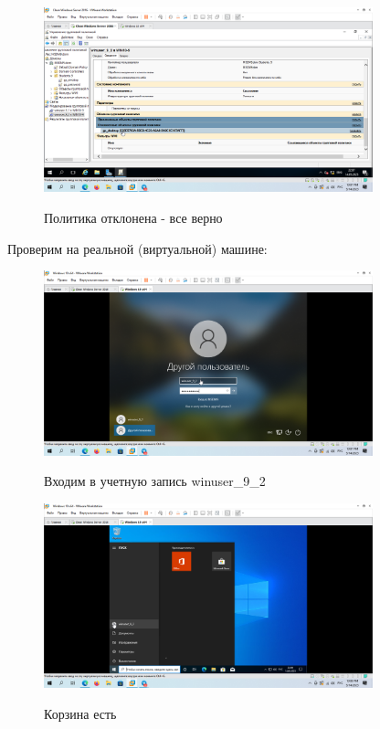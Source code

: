 \documentclass[a4paper]{article}
\begin{document}
  \begin{figure}[H]
    \centering
    \includegraphics[width=0.85\textwidth]{5_0174}
    \label{img:174}
    \caption{Политика отклонена - все верно}
  \end{figure}

  Проверим на реальной (виртуальной) машине:

  \begin{figure}[H]
    \centering
    \includegraphics[width=0.85\textwidth]{5_0176}
    \label{img:176}
    \caption{Входим в учетную запись winuser\_9\_2}
  \end{figure}

  \begin{figure}[H]
    \centering
    \includegraphics[width=0.85\textwidth]{5_0177}
    \label{img:177}
    \caption{Корзина есть}
  \end{figure}
\end{document}
